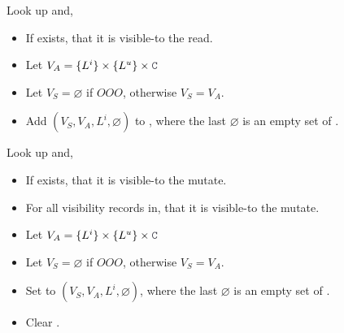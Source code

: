 \filbreak
{} Look up  and,
\begin{itemize}
  \item If  exists,  that it is visible-to the read.
  \filbreak
  \item Let $V_A = \{ L^i \} \times \{ L^u \} \times \lighttt{C}$
  \filbreak
  \item Let $V_S = \varnothing$ if $OOO$, otherwise $V_S = V_A$.
  \filbreak
  \item Add $(V_S, V_A, L^i, \varnothing)$ to , where the last $\varnothing$ is an empty set of .
\end{itemize}

\filbreak
{} Look up  and,
\begin{itemize}
  \item If  exists,  that it is visible-to the mutate.
  \filbreak
  \item For all visibility records in,  that it is visible-to the mutate.
  \filbreak
  \item Let $V_A = \{ L^i \} \times \{ L^u \} \times \lighttt{C}$
  \filbreak
  \item Let $V_S = \varnothing$ if $OOO$, otherwise $V_S = V_A$.
  \filbreak
  \item Set  to $(V_S, V_A, L^i, \varnothing)$, where the last $\varnothing$ is an empty set of .
  \filbreak
  \item Clear .
\end{itemize}

